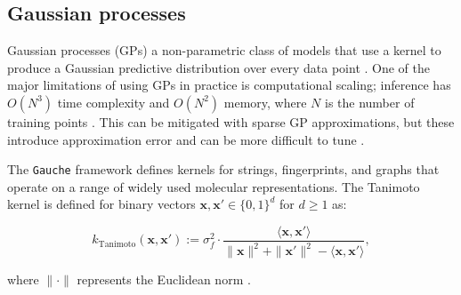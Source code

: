 \subsection{Gaussian processes}

Gaussian processes (GPs) a non-parametric class of models that use a kernel to produce a Gaussian predictive distribution over every data point \citep{Obrezanova2007, Rasmussen2005}. One of the major limitations of using GPs in practice is computational scaling; inference has $O(N^3)$ time complexity and $O(N^2)$ memory, where $N$ is the number of training points \citep{Rasmussen2005}. This can be mitigated with sparse GP approximations, but these introduce approximation error and can be more difficult to tune \citep{quinonero2005}.


The \texttt{Gauche} framework \citep{gauche} defines kernels for strings, fingerprints, and graphs that operate on a range of widely used molecular representations. The Tanimoto kernel \citep{Ralaivola2005, moss2020} is defined for binary vectors $\mathbf{x}, \mathbf{x}' \in \{0, 1\}^d$ for $d \geq 1$ as:

$$
k_{\text{Tanimoto}}(\mathbf{x}, \mathbf{x}') := \sigma_f^2 \cdot \frac{\langle \mathbf{x}, \mathbf{x}' \rangle}{\|\mathbf{x}\|^2 + \|\mathbf{x}'\|^2 - \langle \mathbf{x}, \mathbf{x}' \rangle},
$$

where $\|\cdot\|$ represents the Euclidean norm \citep{gauche}. 

